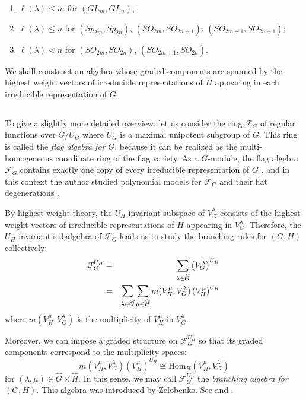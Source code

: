 \documentclass[11pt]{amsart}
\numberwithin{equation}{subsection}
\begin{document}
\begin{enumerate}
\item $\ell (\lambda )\leq m$ for $({GL}_{m},{GL}_{n});$

\item $\ell (\lambda )\leq n$ for $({Sp}_{2m},{Sp}_{2n})$, $({SO}_{2m},
{SO}_{2n+1})$, $({SO}_{2m+1},{SO}_{2n+1});$

\item $\ell (\lambda )<n$ for $({SO}_{2m},{SO}_{2n})$, $({SO}_{2m+1},
{SO}_{2n}).$
\end{enumerate}


We shall construct an algebra whose graded components are spanned by the
highest weight vectors of irreducible representations of $H$ appearing in
each irreducible representation of $G$.

\subsection{}
To give a slightly more detailed overview, let us consider the ring 
$\mathcal{F}_{G}$ of regular functions over $G/U_{G}$ where $U_{G}$ is a
maximal unipotent subgroup of $G$. 
This ring is called the \textit{flag algebra for} $G$, because it can be 
realized as the multi-homogeneous coordinate ring of the flag variety. 
As a $G$-module, the flag algebra $\mathcal{F}_{G}$ contains exactly one 
copy of every irreducible representation of $G$ \cite{LT79,LT85}, and in 
this context the author  studied polynomial models for $\mathcal{F}_{G}$ 
and their flat degenerations \cite{Ki08,Ki09}. 

\medskip

By highest weight theory, the $U_{H}$-invariant subspace of $V_{G}^{\lambda }$ 
consists of the highest weight vectors of irreducible representations of $H$ 
appearing in $V_{G}^{\lambda }$. 
Therefore, the $U_{H} $-invariant subalgebra of $\mathcal{F}_{G}$ leads us to 
study the branching rules for $(G,H)$ collectively:
\begin{eqnarray}
\mathcal{F}_{G}^{U_{H}} &=&\sum_{\lambda \in \widehat{G}}\left(
V_{G}^{\lambda }\right) ^{U_{H}}  \label{general branching algebra} \\
&=&\sum_{\lambda \in \widehat{G}}\sum_{\mu \in \widehat{H}}m(V_{H}^{\mu},
V_{G}^{\lambda })\left( V_{H}^{\mu }\right) ^{U_{H}}  \notag
\end{eqnarray}where $m(V_{H}^{\mu },V_{G}^{\lambda })$ is the multiplicity of $V_{H}^{\mu}$ 
in $V_{G}^{\lambda }$. 

Moreover, we can impose a graded structure on 
$\mathcal{F}_{G}^{U_{H}}$ so that its graded components correspond to the
multiplicity spaces:
\begin{equation*}
m(V_{H}^{\mu },V_{G}^{\lambda })\left( V_{H}^{\mu }\right) ^{U_{H}}
\cong \mathrm{Hom}_{H}(V_{H}^{\mu },V_{G}^{\lambda })
\end{equation*}
for $\left( \lambda ,\mu \right) \in \widehat{G}\times \widehat{H}$. In this
sense, we may call $\mathcal{F}_{G}^{U_{H}}$ the \textit{branching algebra for} 
$(G,H)$. This algebra was introduced by Zelobenko. 
See \cite{Ze62} and \cite{ Ze73}.
\end{document}
